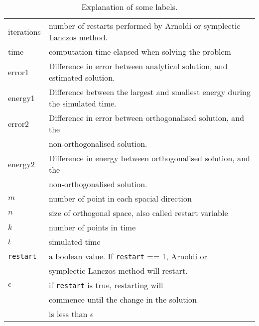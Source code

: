 \begin{table}[h]
\centering
\begin{tabular}{l| l}
 iterations& number of restarts performed by Arnoldi or symplectic Lanczos method.  \\
 time & computation time elapsed when solving the problem \\
 error1 &  Difference in error between analytical solution, and estimated solution. \\
 energy1 & Difference between the largest and smallest energy during the simulated time. \\
 error2 & Difference in error between orthogonalised solution, and the\\& non-orthogonalised solution. \\
 energy2 &Difference in energy between orthogonalised solution, and the\\& non-orthogonalised solution. \\
$m$ & number of point in each spacial direction \\
$n$ & size of orthogonal space, also called restart variable \\
$k$ & number of points in time \\
$t$ & simulated time \\
\texttt{restart}& a boolean value. If \texttt{restart} == 1, Arnoldi or \\&symplectic Lanczos method will restart. \\
$\epsilon$ & if \texttt{restart} is true, restarting will\\& commence until the change in the solution\\& is less than $\epsilon$ \\
\end{tabular}
\caption{ Explanation of some labels. }
\label{tab:labels}
\end{table}

